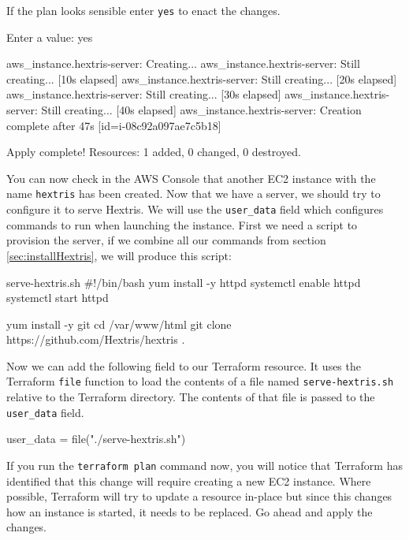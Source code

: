 \documentclass{csse4400}
\begin{document}
If the plan looks sensible enter \texttt{yes} to enact the changes.

\begin{code}[numbers=none]{}
  Enter a value: yes

aws_instance.hextris-server: Creating...
aws_instance.hextris-server: Still creating... [10s elapsed]
aws_instance.hextris-server: Still creating... [20s elapsed]
aws_instance.hextris-server: Still creating... [30s elapsed]
aws_instance.hextris-server: Still creating... [40s elapsed]
aws_instance.hextris-server: Creation complete after 47s [id=i-08c92a097ae7c5b18]

Apply complete! Resources: 1 added, 0 changed, 0 destroyed.
\end{code}

You can now check in the AWS Console that another EC2 instance with the name \texttt{hextris} has been created.
Now that we have a server, we should try to configure it to serve Hextris.
We will use the \texttt{user\_data} field which configures commands to run when launching the instance.
First we need a script to provision the server, if we combine all our commands from section \ref{sec:installHextris}, we will produce this script:

\begin{code}[language=bash,numbers=none]{serve-hextris.sh}
#!/bin/bash
yum install -y httpd
systemctl enable httpd
systemctl start httpd

yum install -y git
cd /var/www/html
git clone https://github.com/Hextris/hextris .  
\end{code}



Now we can add the following field to our Terraform resource.
It uses the Terraform \texttt{file} function to load the contents of a file named \texttt{serve-hextris.sh} relative to the Terraform directory.
The contents of that file is passed to the \texttt{user\_data} field.

\begin{code}[language=terraform,numbers=none]{}
user_data = file("./serve-hextris.sh")
\end{code}

If you run the \texttt{terraform plan} command now,
you will notice that Terraform has identified that this change will require creating a new EC2 instance.
Where possible, Terraform will try to update a resource in-place but since this changes how an instance is started, it needs to be replaced.
Go ahead and apply the changes.
\end{document}
